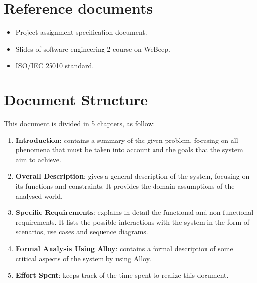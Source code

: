 \section{Reference documents}
\begin{itemize}
	\item Project assignment specification document.
	\item Slides of software engineering 2 course on WeBeep.
        \item ISO/IEC 25010 standard.
\end{itemize}

\section{Document Structure}
This document is divided in 5 chapters, as follow:
\begin{enumerate}
	\item \textbf{Introduction}: contains a summary of the given problem, focusing on all phenomena that must be taken into account and the goals that the system aim to achieve.

	\item \textbf{Overall Description}: gives a general description of the system, focusing on its functions and constraints. It provides the domain assumptions of the analysed world.

	\item \textbf{Specific Requirements}: explains in detail the functional and non functional requirements. It lists the possible interactions with the system in the form of scenarios, use cases and sequence diagrams.

	\item \textbf{Formal Analysis Using Alloy}: contains a formal description of some critical aspects of the system by using Alloy.

	\item \textbf{Effort Spent}: keeps track of the time spent to realize this document.
\end{enumerate}